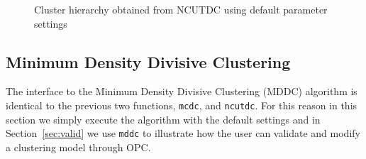 \documentclass{book}
\begin{document}
\begin{figure}
\begin{htmlonly}
%
%
\end{htmlonly}
%
\caption{Cluster hierarchy obtained from NCUTDC using default parameter settings}
%
\label{fig:ncut1}
\end{figure}
%
%
%
%
%

\subsection{Minimum Density Divisive Clustering}

The interface to the Minimum Density Divisive Clustering (MDDC) algorithm is
identical to the previous two functions, {\tt mcdc}, and {\tt ncutdc}.
%
For this reason in this section we simply execute the algorithm with the
default settings and in Section~\ref{sec:valid} we use {\tt mddc} to illustrate how
the user can validate and modify a clustering model through OPC.
\end{document}
